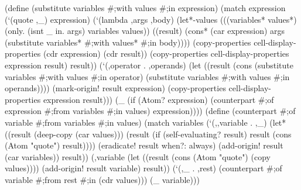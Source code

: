 \documentclass[acmsmall]{acmart}
\newenvironment{Snippet}{\Verbatim[samepage=true]}{\endVerbatim}
\begin{document}
\begin{Snippet}
  (define (substitute variables #;with values #;in expression)
\end{Snippet}
\begin{Snippet}
    (match expression
      (`(quote ,_)
       expression)
\end{Snippet}
\begin{Snippet}
      (`(lambda ,args ,body)
       (let*-values (((variables* values*) (only. (isnt _ in. args) variables values))
		     ((result) (cons* 
                                (car expression)
                                args
		                (substitute variables* #;with values* #;in body))))
	 (copy-properties cell-display-properties (cdr expression) (cdr result))
	 (copy-properties cell-display-properties expression result)
	 result))
\end{Snippet}
\begin{Snippet}
      (`(,operator . ,operands)
       (let ((result (cons (substitute variables #;with values #;in operator)
			   (substitute variables #;with values #;in operands))))
	 (mark-origin! result expression)
	 (copy-properties cell-display-properties expression result)))
\end{Snippet}
\begin{Snippet}
      (_
       (if (Atom? expression)
	   (counterpart #;of expression #;from variables #;in values)
	   expression))))
\end{Snippet}
\begin{Snippet}
  (define (counterpart #;of variable #;from variables #;in values)
    (match variables
\end{Snippet}
\begin{Snippet}
      (`(,,variable . ,_)
       (let* ((result (deep-copy (car values)))
	      (result (if (self-evaluating? result)
			  result
			  (cons (Atom "quote") result))))
	 (eradicate! result when?: always)
	 (add-origin! result (car variables))
	 result))
\end{Snippet}
\begin{Snippet}
      (,variable
       (let ((result (cons (Atom "quote") (copy values))))
	 (add-origin! result variable)
	 result))
\end{Snippet}
\begin{Snippet}
      (`(,_ . ,rest)
       (counterpart #;of variable #;from rest #;in (cdr values)))
\end{Snippet}
\begin{Snippet}
      (_
       variable)))
\end{Snippet}
\end{document}
